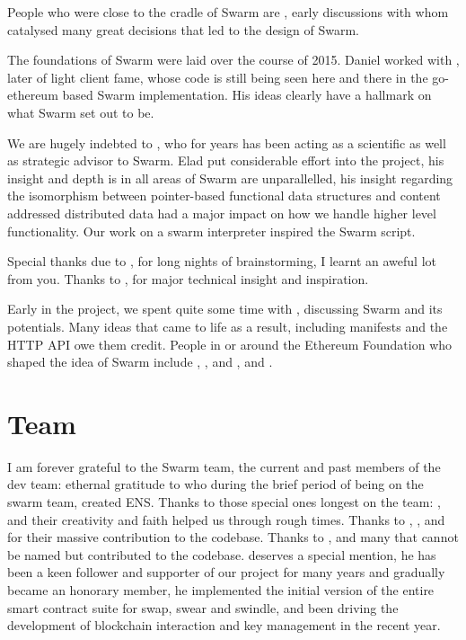 People who were close to the cradle of Swarm are ,  early discussions with whom catalysed many great decisions that led to the design of Swarm.

The foundations of Swarm were laid over the course of 2015.
Daniel worked with , later of light client fame, whose code is still being seen here and there in the go-ethereum based Swarm implementation. His ideas clearly have a hallmark on what Swarm set out to be. 

We are hugely indebted to , who for years has been acting as a scientific as well as strategic advisor to Swarm. Elad put considerable effort into the project, his insight and depth is in all areas of Swarm are unparallelled, his insight regarding the isomorphism between pointer-based functional data structures and content addressed distributed data had a major impact on how we handle higher level functionality. Our work on a swarm interpreter inspired the Swarm script.

Special thanks due to ,  for long nights of brainstorming, I learnt an aweful lot from you. Thanks to ,  for major technical insight and inspiration.

Early in the project, we spent quite some time with ,  discussing Swarm and its potentials. Many ideas that came to life as a result, including manifests and the HTTP API owe them credit. People in or around the Ethereum Foundation who shaped the idea of Swarm include , ,  and ,  and . 

\section*{Team}

I am forever grateful to the Swarm team, the current and past members of the dev team: ethernal gratitude to  who during the brief period of being on the swarm team, created ENS. Thanks to those special ones longest on the team: ,  and  their creativity and faith helped us through rough  times. Thanks to , ,  and  for their massive contribution to the codebase. Thanks to ,  and many that cannot be named but contributed to the codebase.
 deserves a special mention, he has been a keen follower and supporter of our project for many years and gradually became an honorary member, he implemented the initial version of the entire smart contract suite for swap, swear and swindle, and been driving the development of blockchain interaction and key management in the recent year.

